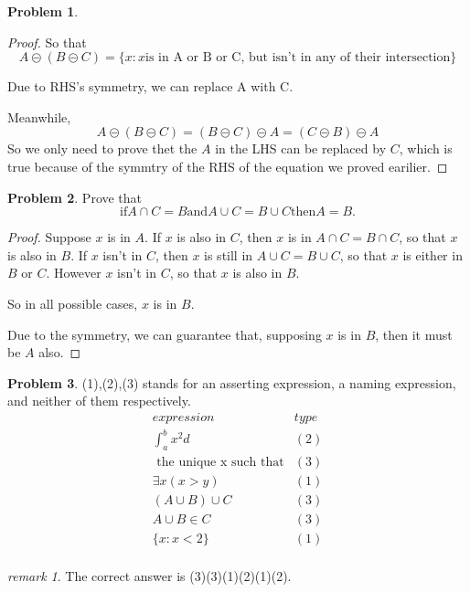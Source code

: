 \documentclass[a4paper,11pt]{article}%
\theoremstyle{remark}
\newtheorem*{remark}{remark}
\theoremstyle{definition}
\newtheorem{problem}{Problem}[subsection]
\begin{document}
\begin{problem}
\begin{proof}
    So that
\[A\circleddash (B\circleddash C)=\{x:x \text{is in A or B or C, but isn't in any of their intersection}\}\]

Due to RHS's symmetry, we can replace A with C.

Meanwhile,
\[A\circleddash(B\circleddash C)=(B\circleddash C)\circleddash A=(C\circleddash B)\circleddash A\]
So we only need to prove thet the $A$ in the LHS can be replaced by $C$, which  is true because of the symmtry of 
the RHS of the equation we proved earilier.
    \end{proof}
\end{problem}
\begin{problem}
    Prove that 
    \[\text{if}A\cap C=B \text{and} A\cup C =B \cup C \text{then}A=B.\]
    \begin{proof}
        Suppose $x$ is in $A$. If $x$ is also in $C$, then $x$ is in $A\cap C=B\cap C$,
        so that $x$ is also in $B$.
        If $x$ isn't in $C$, then $x$ is still in $A\cup C=B\cup C$, so that $x$ is
        either in $B$ or $C$. However $x$ isn't in $C$, so that $x$ is also in $B$.

        So in all possible cases, $x$ is in $B$.

        Due to the symmetry, we can guarantee that, supposing $x$ is in $B$, then it must be $A$ also.
    \end{proof}
\end{problem}
\begin{problem}
    (1),(2),(3) stands for an asserting expression, a naming expression, and neither of them respectively.
   \[ \begin{array}{cc}
        expression & type \\
        \hline 
        \int_{a}^{b}x^2d&(2)\\
       \text{ the unique x such that} & (3)\\
        \exists x(x>y)& (1)\\
        (A\cup B)\cup C& (3)\\
        A\cup B\in C& (3)\\
        \{x:x<2\}&(1)\\
    \end{array}
\]
\end{problem}
\begin{remark}
    The correct answer is (3)(3)(1)(2)(1)(2).
\end{remark}
\end{document}
